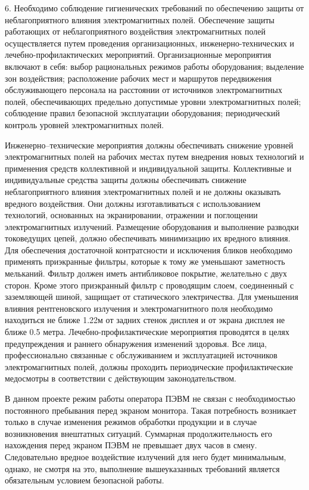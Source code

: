 6. Необходимо соблюдение гигиенических требований по обеспечению защиты от неблагоприятного влияния электромагнитных полей.
Обеспечение защиты работающих от неблагоприятного воздействия 
электромагнитных полей осуществляется путем проведения организационных,
инженерно-технических и лечебно-профилактических мероприятий.
Организационные мероприятия включают в себя: выбор рациональных режимов работы оборудования;
выделение зон воздействия; расположение рабочих мест и маршрутов передвижения обслуживающего
персонала на расстоянии от источников электромагнитных полей, обеспечивающих предельно допустимые
уровни электромагнитных полей; соблюдение правил безопасной эксплуатации оборудования;
периодический контроль уровней электромагнитных полей.


Инженерно--технические мероприятия должны обеспечивать снижение уровней 
электромагнитных полей на рабочих местах путем внедрения новых технологий
и применения средств коллективной и индивидуальной защиты. Коллективные
и индивидуальные средства защиты должны обеспечивать снижение 
неблагоприятного влияния электромагнитных полей и не должны оказывать 
вредного воздействия. Они должны изготавливаться с использованием технологий,
основанных на экранировании, отражении и поглощении электромагнитных излучений.
Размещение оборудования и выполнение разводки токоведущих цепей, должно обеспечивать
минимизацию их  вредного влияния. Для обеспечения достаточной контратсности и исключения
бликов необходимо применять приэкранные фильтры, которые к тому же уменьшают
заметность мельканий. Фильтр должен иметь антибликовое покрытие, желательно с двух сторон.
Кроме этого приэкранный фильтр с проводящим слоем, соединенный с заземляющей шиной,
защищает от статического электричества. Для уменьшения влияния рентгеновского излучения и
электромагнитного  поля необходимо находиться не ближе 1.22м от задних стенок дисплея и от
экрана дисплея не ближе 0.5 метра. Лечебно-профилактические мероприятия проводятся в целях
предупреждения и  раннего обнаружения изменений здоровья. Все лица, профессионально связанные с
обслуживанием и эксплуатацией источников электромагнитных полей, должны проходить периодические
профилактические медосмотры в соответствии с действующим законодательством.

В данном проекте режим работы оператора ПЭВМ не связан с необходимостью 
постоянного пребывания  перед экраном монитора. Такая потребность возникает только в случае
изменения режимов обработки продукции и в случае возникновения внештатных ситуаций.
Суммарная продолжительность его нахождения перед экраном ПЭВМ  не превышает двух часов в смену.
Следовательно вредное воздействие излучений для него будет минимальным, однако, не смотря
на это, выполнение вышеуказанных требований является обязательным условием безопасной работы.


